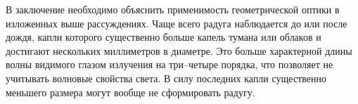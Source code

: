 В заключение необходимо объяснить применимость геометрической оптики в изложенных выше рассуждениях. Чаще всего радуга наблюдается до или после дождя, капли которого существенно больше капель тумана или облаков и достигают нескольких миллиметров в диаметре. Это больше характерной длины волны видимого глазом излучения на три--четыре порядка, что позволяет не учитывать волновые свойства света. В силу последних капли существенно меньшего размера могут вообще не сформировать радугу. 